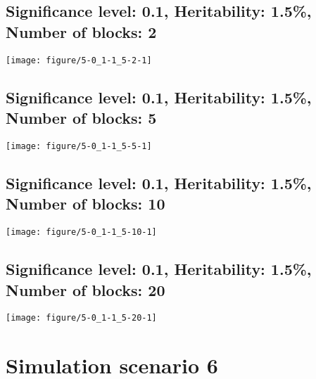 \documentclass[11pt,letter]{article}\usepackage[]{graphicx}\usepackage[]{color}
\makeatletter
\def\maxwidth{ %
  \ifdim\Gin@nat@width>\linewidth
    \linewidth
  \else
    \Gin@nat@width
  \fi
}
\newenvironment{knitrout}{}{} %
\makeatother
\begin{document}
\newpage
\subsection{Significance level: 0.1, Heritability: 1.5\%, Number of blocks: 2}

\begin{knitrout}
\color{fgcolor}
\texttt{[image: figure/5-0\_1-1\_5-2-1]} 

\end{knitrout}

\newpage
\subsection{Significance level: 0.1, Heritability: 1.5\%, Number of blocks: 5}

\begin{knitrout}
\color{fgcolor}
\texttt{[image: figure/5-0\_1-1\_5-5-1]} 

\end{knitrout}

\newpage
\subsection{Significance level: 0.1, Heritability: 1.5\%, Number of blocks: 10}

\begin{knitrout}
\color{fgcolor}
\texttt{[image: figure/5-0\_1-1\_5-10-1]} 

\end{knitrout}

\newpage
\subsection{Significance level: 0.1, Heritability: 1.5\%, Number of blocks: 20}

\begin{knitrout}
\color{fgcolor}
\texttt{[image: figure/5-0\_1-1\_5-20-1]} 

\end{knitrout}

\newpage

\section{Simulation scenario 6}
\end{document}

